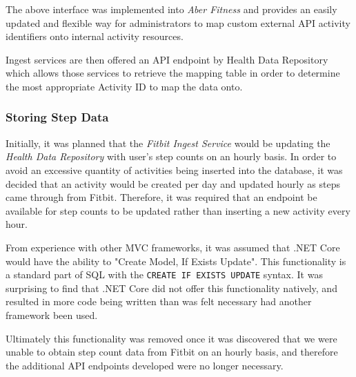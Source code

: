 The above interface was implemented into \textit{Aber Fitness} and provides an easily updated and flexible way for administrators to map custom external API activity identifiers onto internal activity resources. 

Ingest services are then offered an API endpoint by Health Data Repository which allows those services to retrieve the mapping table in order to determine the most appropriate Activity ID to map the data onto.

\subsubsection{Storing Step Data}
Initially, it was planned that the \textit{Fitbit Ingest Service} would be updating the \textit{Health Data Repository} with user's step counts on an hourly basis. In order to avoid an excessive quantity of activities being inserted into the database, it was decided that an activity would be created per day and updated hourly as steps came through from Fitbit. Therefore, it was required that an endpoint be available for step counts to be updated rather than inserting a new activity every hour. 

From experience with other MVC frameworks, it was assumed that .NET Core would have the ability to "Create Model, If Exists Update". This functionality is a standard part of SQL with the \lstinline{CREATE IF EXISTS UPDATE} syntax. It was surprising to find that .NET Core did not offer this functionality natively, and resulted in more code being written than was felt necessary had another framework been used. 

Ultimately this functionality was removed once it was discovered that we were unable to obtain step count data from Fitbit on an hourly basis, and therefore the additional API endpoints developed were no longer necessary. 
